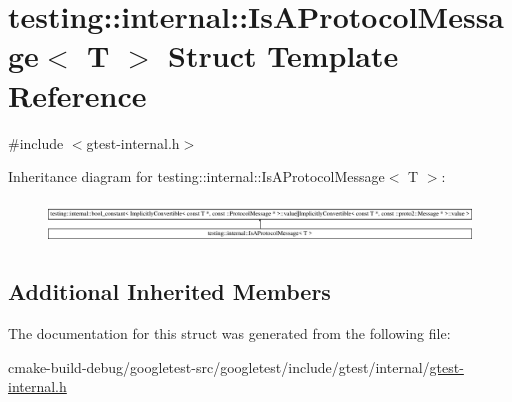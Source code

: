 \hypertarget{structtesting_1_1internal_1_1IsAProtocolMessage}{}\section{testing\+::internal\+::Is\+A\+Protocol\+Message$<$ T $>$ Struct Template Reference}
\label{structtesting_1_1internal_1_1IsAProtocolMessage}


{\ttfamily \#include $<$gtest-\/internal.\+h$>$}

Inheritance diagram for testing\+::internal\+::Is\+A\+Protocol\+Message$<$ T $>$\+:\begin{figure}[H]
\begin{center}
\leavevmode
\includegraphics[height=1.132457cm]{structtesting_1_1internal_1_1IsAProtocolMessage}
\end{center}
\end{figure}
\subsection*{Additional Inherited Members}


The documentation for this struct was generated from the following file\+:\begin{DoxyCompactItemize}
\item 
cmake-\/build-\/debug/googletest-\/src/googletest/include/gtest/internal/\mbox{\hyperlink{gtest-internal_8h}{gtest-\/internal.\+h}}\end{DoxyCompactItemize}
